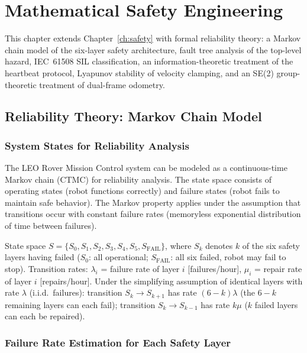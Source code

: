 \chapter{Mathematical Safety Engineering}
\label{ch:safety-math}

This chapter extends Chapter~\ref{ch:safety} with formal reliability theory: a Markov chain model of the six-layer safety architecture, fault tree analysis of the top-level hazard, IEC~61508 SIL classification, an information-theoretic treatment of the heartbeat protocol, Lyapunov stability of velocity clamping, and an SE(2) group-theoretic treatment of dual-frame odometry.

\section{Reliability Theory: Markov Chain Model}

\subsection{System States for Reliability Analysis}

The LEO Rover Mission Control system can be modeled as a continuous-time Markov chain (CTMC) for reliability analysis. The state space consists of operating states (robot functions correctly) and failure states (robot fails to maintain safe behavior). The Markov property applies under the assumption that transitions occur with constant failure rates (memoryless exponential distribution of time between failures).

\begin{eqblock}
State space $S = \{S_0, S_1, S_2, S_3, S_4, S_5, S_{\text{FAIL}}\}$, where $S_k$ denotes $k$ of the six safety layers having failed ($S_0$: all operational; $S_{\text{FAIL}}$: all six failed, robot may fail to stop). Transition rates: $\lambda_i$ = failure rate of layer $i$ [failures/hour], $\mu_i$ = repair rate of layer $i$ [repairs/hour]. Under the simplifying assumption of identical layers with rate $\lambda$ (i.i.d.\ failures): transition $S_k\to S_{k+1}$ has rate $(6-k)\lambda$ (the $6-k$ remaining layers can each fail); transition $S_k\to S_{k-1}$ has rate $k\mu$ ($k$ failed layers can each be repaired).
\end{eqblock}

\subsection{Failure Rate Estimation for Each Safety Layer}

